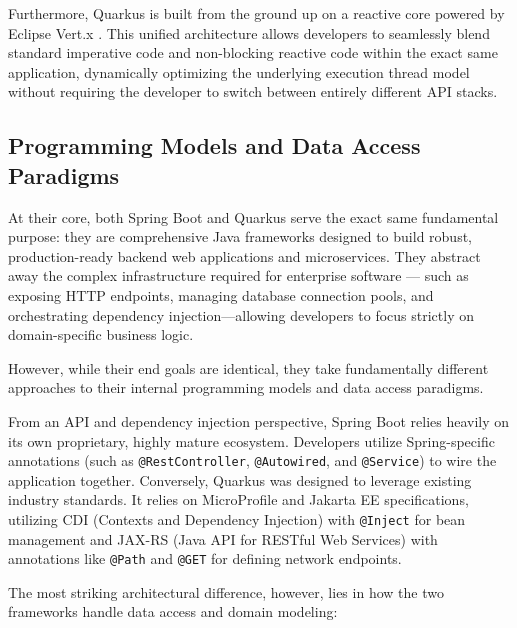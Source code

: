 Furthermore, Quarkus is built from the ground up on a reactive core powered by Eclipse Vert.x \cite{vertx}. This unified architecture allows developers to seamlessly blend standard imperative code and non-blocking reactive code within the exact same application, dynamically optimizing the underlying execution thread model without requiring the developer to switch between entirely different API stacks.

\subsection{Programming Models and Data Access Paradigms}

At their core, both Spring Boot and Quarkus serve the exact same fundamental purpose: they are comprehensive Java frameworks designed to build robust, production-ready backend web applications and microservices. They abstract away the complex infrastructure required for enterprise software — such as exposing HTTP endpoints, managing database connection pools, and orchestrating dependency injection—allowing developers to focus strictly on domain-specific business logic. 

However, while their end goals are identical, they take fundamentally different approaches to their internal programming models and data access paradigms. 

From an API and dependency injection perspective, Spring Boot relies heavily on its own proprietary, highly mature ecosystem. Developers utilize Spring-specific annotations (such as \texttt{@RestController}, \texttt{@Autowired}, and \texttt{@Service}) to wire the application together. Conversely, Quarkus was designed to leverage existing industry standards. It relies on MicroProfile and Jakarta EE specifications, utilizing CDI (Contexts and Dependency Injection) with \texttt{@Inject} for bean management and JAX-RS (Java API for RESTful Web Services) with annotations like \texttt{@Path} and \texttt{@GET} for defining network endpoints.

The most striking architectural difference, however, lies in how the two frameworks handle data access and domain modeling:

